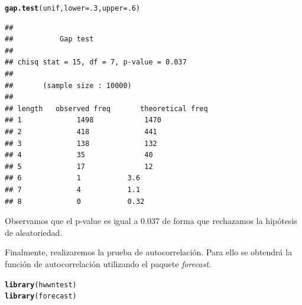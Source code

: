 \documentclass[12 pt]{article}\usepackage[]{graphicx}\usepackage[]{color}
\makeatletter
\newcommand{\hlnum}[1]{\textcolor[rgb]{0.686,0.059,0.569}{#1}}%
\newcommand{\hlstd}[1]{\textcolor[rgb]{0.345,0.345,0.345}{#1}}%
\newcommand{\hlkwc}[1]{\textcolor[rgb]{0.333,0.667,0.333}{#1}}%
\newcommand{\hlkwd}[1]{\textcolor[rgb]{0.737,0.353,0.396}{\textbf{#1}}}%
\newenvironment{kframe}{%
 \def\at@end@of@kframe{}%
 \ifinner\ifhmode%
  \def\at@end@of@kframe{\end{minipage}}%
  \begin{minipage}{\columnwidth}%
 \fi\fi%
 \def\FrameCommand##1{\hskip\@totalleftmargin \hskip-\fboxsep
 \colorbox{shadecolor}{##1}\hskip-\fboxsep
     \hskip-\linewidth \hskip-\@totalleftmargin \hskip\columnwidth}%
 \MakeFramed {\advance\hsize-\width
   \@totalleftmargin\z@ \linewidth\hsize
   \@setminipage}}%
 {\par\unskip\endMakeFramed%
 \at@end@of@kframe}
\newenvironment{knitrout}{}{} %
\makeatother
\begin{document}
\begin{enumerate}
\begin{knitrout}
\color{fgcolor}\begin{kframe}
\begin{alltt}
\hlkwd{gap.test}\hlstd{(unif,} \hlkwc{lower} \hlstd{=} \hlnum{.3}\hlstd{,} \hlkwc{upper} \hlstd{=} \hlnum{.6}\hlstd{)}
\end{alltt}
\begin{verbatim}
## 
## 			 Gap test
## 
## chisq stat = 15, df = 7, p-value = 0.037
## 
## 		 (sample size : 10000)
## 
## length	observed freq		theoretical freq
## 1 			 1498 			 1470 
## 2 			 418 			 441 
## 3 			 138 			 132 
## 4 			 35 			 40 
## 5 			 17 			 12 
## 6 			 1 			 3.6 
## 7 			 4 			 1.1 
## 8 			 0 			 0.32
\end{verbatim}
\end{kframe}
\end{knitrout}

Observamos que el p-value es igual a 0.037 de forma que rechazamos la hipótesis de aleatoriedad.

Finalmente, realizaremos la prueba de autocorrelación. Para ello se obtendrá la función de autocorrelación utilizando el paquete \textit{forecast}.

\begin{knitrout}
\color{fgcolor}\begin{kframe}
\begin{alltt}
\hlkwd{library}\hlstd{(hwwntest)}
\hlkwd{library}\hlstd{(forecast)}


\end{alltt}
\end{kframe}
\end{knitrout}
\end{enumerate}
\end{document}
